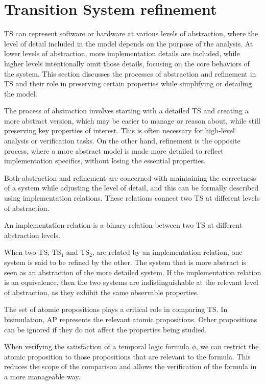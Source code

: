 \section{Transition System refinement}

TS can represent software or hardware at various levels of abstraction, where the level of detail included in the model depends on the purpose of the analysis. 
At lower levels of abstraction, more implementation details are included, while higher levels intentionally omit those details, focusing on the core behaviors of the system. 
This section discusses the processes of abstraction and refinement in TS and their role in preserving certain properties while simplifying or detailing the model.

The process of abstraction involves starting with a detailed TS and creating a more abstract version, which may be easier to manage or reason about, while still preserving key properties of interest. 
This is often necessary for high-level analysis or verification tasks. On the other hand, refinement is the opposite process, where a more abstract model is made more detailed to reflect implementation specifics, without losing the essential properties.

Both abstraction and refinement are concerned with maintaining the correctness of a system while adjusting the level of detail, and this can be formally described using implementation relations.
These relations connect two TS at different levels of abstraction.
\begin{definition}
    An implementation relation is a binary relation between two TS at different abstraction levels.
\end{definition}
\noindent When two TS, $\text{TS}_1$ and $\text{TS}_2$, are related by an implementation relation, one system is said to be refined by the other. 
The system that is more abstract is seen as an abstraction of the more detailed system. 
If the implementation relation is an equivalence, then the two systems are indistinguishable at the relevant level of abstraction, as they exhibit the same observable properties.

The set of atomic propositions plays a critical role in comparing TS. 
In bisimulation, $\text{AP}$ represents the relevant atomic propositions. 
Other propositions can be ignored if they do not affect the properties being studied.

When verifying the satisfaction of a temporal logic formula $\phi$, we can restrict the atomic proposition to those propositions that are relevant to the formula. 
This reduces the scope of the comparison and allows the verification of the formula in a more manageable way.

